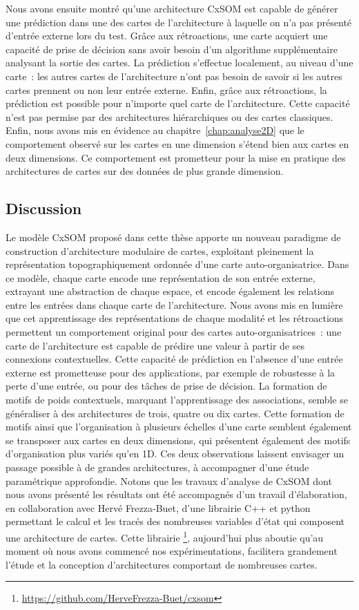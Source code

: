Nous avons ensuite montré qu'une architecture CxSOM est capable de générer une prédiction dans une des cartes de l'architecture à laquelle on n'a pas présenté d'entrée externe lors du test. 
Grâce aux rétroactions, une carte acquiert une capacité de prise de décision sans avoir besoin d'un algorithme supplémentaire analysant la sortie des cartes. 
La prédiction s'effectue localement, au niveau d'une carte~: les autres cartes de l'architecture n'ont pas besoin de savoir si les autres cartes prennent ou non leur entrée externe.
Enfin, grâce aux rétroactions, la prédiction est possible pour n'importe quel carte de l'architecture. Cette capacité n'est pas permise par des architectures hiérarchiques ou des cartes classiques.
Enfin, nous avons mis en évidence au chapitre~\ref{chap:analyse2D} que le comportement observé sur les cartes en une dimension s'étend bien aux cartes en deux dimensions.
Ce comportement est prometteur pour la mise en pratique des architectures de cartes sur des données de plus grande dimension.


\subsection*{Discussion}

Le modèle CxSOM proposé dans cette thèse apporte un nouveau paradigme de construction d'architecture modulaire de cartes, exploitant pleinement la représentation topographiquement ordonnée d'une carte auto-organisatrice.
Dans ce modèle, chaque carte encode une représentation de son entrée externe, extrayant une abstraction de chaque espace, et encode également les relations entre les entrées dans chaque carte de l'architecture. 
Nous avons mis en lumière que cet apprentissage des représentations de chaque modalité et les rétroactions permettent un comportement original pour des cartes auto-organisatrices~: une carte de l'architecture est capable de prédire une valeur à partir de ses connexions contextuelles. Cette capacité de prédiction en l'absence d'une entrée externe est prometteuse pour des applications, par exemple de robustesse à la perte d'une entrée, ou pour des tâches de prise de décision.
La formation de motifs de poids contextuels, marquant l'apprentissage des associations, semble se généraliser à des architectures de trois, quatre ou dix cartes.
Cette formation de motifs ainsi que l'organisation à plusieurs échelles d'une carte semblent également se transposer aux cartes en deux dimensions, qui présentent également des motifs d'organisation plus variés qu'en 1D.
Ces deux observations laissent envisager un passage possible à de grandes architectures, à accompagner d'une étude paramétrique approfondie.
Notons que les travaux d'analyse de CxSOM dont nous avons présenté les résultats ont été accompagnés d'un travail d'élaboration, en collaboration avec Hervé Frezza-Buet, d'une librairie C++ et python permettant le calcul et les tracés des nombreuses variables d'état qui composent une architecture de cartes.
Cette librairie \footnote{\url{https://github.com/HerveFrezza-Buet/cxsom}}, aujourd'hui plus aboutie qu'au moment où nous avons commencé nos expérimentations, facilitera grandement l'étude et la conception d'architectures comportant de nombreuses cartes.


